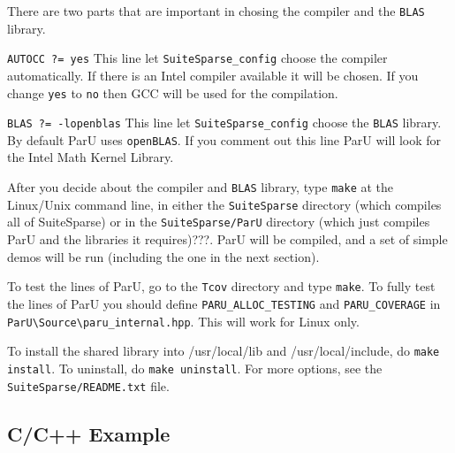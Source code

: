 \documentclass[12pt]{article}
\begin{document}
There are two parts that are important in chosing the compiler and the
\verb'BLAS' library.


\verb 'AUTOCC ?= yes' This line let \verb'SuiteSparse_config' choose the 
compiler automatically. If there is an Intel compiler available it will be chosen. 
If you change \verb'yes' to \verb'no' then GCC will be used for the compilation.


\verb 'BLAS ?= -lopenblas' This line let \verb'SuiteSparse_config' choose the 
\verb'BLAS' library. By default ParU uses  \verb'openBLAS'. If you comment out
this line ParU will look for the Intel Math Kernel Library. 

After you decide about the compiler and \verb'BLAS' library, type \verb'make' at 
the Linux/Unix command line, in either the 
\verb'SuiteSparse' directory (which compiles all of SuiteSparse) or in the 
\verb'SuiteSparse/ParU' directory (which just compiles ParU and the 
libraries it requires)???.  ParU will be compiled, and a set of simple demos 
will be run (including the one in the next section).

To  test the lines of ParU, go to the \verb'Tcov'
directory and type \verb'make'.  To fully test the lines of ParU you 
should define \verb'PARU_ALLOC_TESTING' and \verb'PARU_COVERAGE' in
\verb'ParU\Source\paru_internal.hpp'.
This will work for Linux only.

To install the shared library
into /usr/local/lib and /usr/local/include, do {\tt make install}.
To uninstall, do {\tt make uninstall}.
For more options, see the {\tt SuiteSparse/README.txt} file.

\subsection{C/C++ Example}
\end{document}
